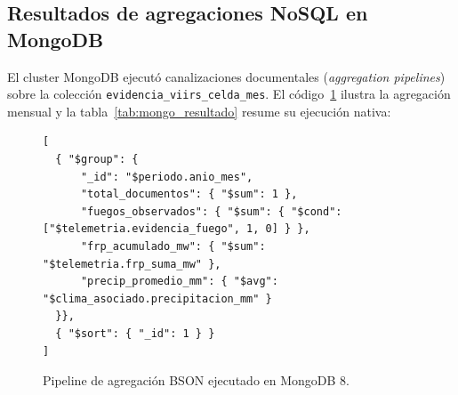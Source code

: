 \documentclass[11pt,a4paper]{article}
\begin{document}
\begin{table}[H]
\centering
\caption{Top celdas con mayor liberaci\'on t\'ermica (FRP) registradas en PostgreSQL/PostGIS.}
\label{tab:sql_top10}
\end{table}

\subsection{Resultados de agregaciones NoSQL en MongoDB}
El cluster MongoDB ejecut\'o canalizaciones documentales (\textit{aggregation pipelines}) sobre la colecci\'on \texttt{evidencia\_viirs\_celda\_mes}. El c\'odigo~\ref{lst:mongo_pipeline} ilustra la agregaci\'on mensual y la tabla~\ref{tab:mongo_resultado} resume su ejecuci\'on nativa:

\begin{figure}[H]
\begin{scriptsize}
\begin{verbatim}
[
  { "$group": {
      "_id": "$periodo.anio_mes",
      "total_documentos": { "$sum": 1 },
      "fuegos_observados": { "$sum": { "$cond": ["$telemetria.evidencia_fuego", 1, 0] } },
      "frp_acumulado_mw": { "$sum": "$telemetria.frp_suma_mw" },
      "precip_promedio_mm": { "$avg": "$clima_asociado.precipitacion_mm" }
  }},
  { "$sort": { "_id": 1 } }
]
\end{verbatim}
\end{scriptsize}
\caption{Pipeline de agregaci\'on BSON ejecutado en MongoDB 8.}
\label{lst:mongo_pipeline}
\end{figure}
\end{document}
